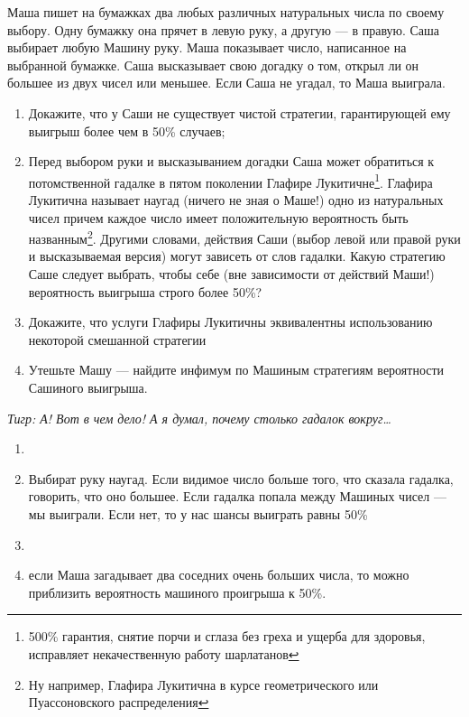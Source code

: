 \begin{problem} \par
\begin{source}  \cite{winkler:gpdp} \end{source}
Маша пишет на бумажках два любых различных натуральных числа по своему выбору. Одну бумажку она прячет в левую руку, а другую --- в правую. Саша выбирает любую Машину руку. Маша показывает число, написанное на выбранной бумажке. Саша высказывает свою догадку о том, открыл ли он большее из двух чисел или меньшее. Если Саша не угадал, то Маша выиграла.\par
\begin{enumerate}
\item Докажите, что у Саши не существует чистой стратегии, гарантирующей ему выигрыш более чем в 50\% случаев;\par
\item Перед выбором руки и высказыванием догадки Саша может обратиться к потомственной гадалке в пятом поколении Глафире Лукитичне\footnote{500\% гарантия, снятие порчи и сглаза без греха и ущерба для здоровья, исправляет некачественную работу шарлатанов}. Глафира Лукитична называет наугад (ничего не зная о Маше!) одно из натуральных чисел причем каждое число имеет положительную вероятность быть названным\footnote{Ну например, Глафира Лукитична в курсе геометрического или Пуассоновского распределения}. Другими словами, действия Саши (выбор левой или правой руки и высказываемая версия) могут зависеть от слов гадалки. Какую стратегию Саше следует выбрать, чтобы  себе (вне зависимости от действий Маши!) вероятность выигрыша строго более 50\%?\par
\item     Докажите, что услуги Глафиры Лукитичны эквивалентны использованию некоторой смешанной стратегии\par
\item     Утешьте Машу --- найдите инфимум по Машиным стратегиям вероятности Сашиного выигрыша.\par
\end{enumerate}
{\it Тигр: А! Вот в чем дело! А я думал, почему столько гадалок вокруг\ldots }



\begin{sol}
\begin{enumerate}
\item

\item Выбират руку наугад. Если видимое число больше того, что сказала гадалка, говорить, что оно большее. Если гадалка попала между Машиных чисел --- мы выиграли. Если нет, то у нас шансы выиграть равны 50\% 

\item

\item если Маша загадывает два соседних очень больших числа, то можно приблизить вероятность машиного проигрыша к 50\%.
\end{enumerate}
\end{sol}
\end{problem}



